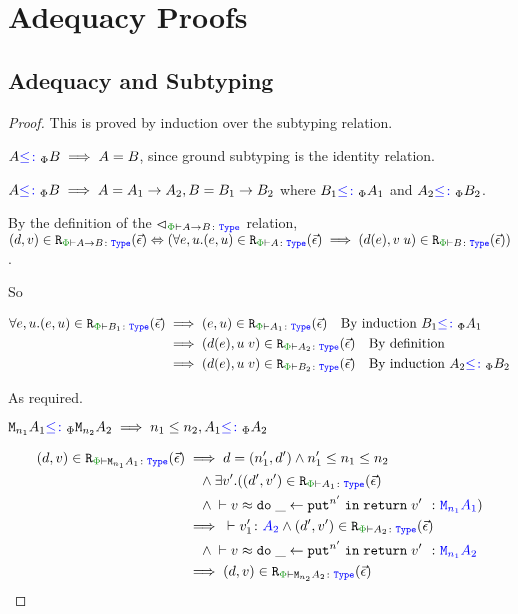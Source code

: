 \chapter{Adequacy Proofs}

\section{Adequacy and Subtyping}
\label{AdequacySubtypingProof}

\begin{framed}
    \begin{proof}
        This is proved by induction over the subtyping relation.
    
        \case{\sground}
        $A{\color{blue} \leq\colon}_\Phi B\implies A = B$, since ground subtyping is the identity relation.
    
    \case{\sfun}
        $A{\color{blue} \leq\colon}_\Phi B\implies A = A_1\rightarrow A_2, B = B_1\rightarrow B_2$ where $B_1{\color{blue} \leq\colon}_\Phi A_1$ and $A_2{\color{blue} \leq\colon}_\Phi B_2$.
    
        By the definition of the $\relates_{\wellformedt{\P}{\ab}}$ relation, $\inLogRelPE{d}{v}{\ab} \Leftrightarrow (\forall e, u. \inLogRelPE{e}{u}{A}\implies \inLogRelPE{d(e)}{\apply{v}{u}}{B})$.
    
        So 
    
        \begin{align*}
            \forall e, u. \inLogRelPE{e}{u}{B_1} & \implies \inLogRelPE{e}{u}{A_1} \qt{By induction $B_1\subtypep A_1$}\\
            & \implies \inLogRelPE{d(e)}{\apply{u}{v}}{A_2}\qt{By definition}\\
            & \implies \inLogRelPE{d(e)}{\apply{u}{v}}{B_2}\qt{By induction $A_2\subtypep B_2$}
        \end{align*}
    
        As required.
    \case{\seffect}
    
    $\texttt{M}_{n_1}{A_1} {\color{blue} \leq\colon}_\Phi \texttt{M}_{n_2}{A_2} \implies n_1\leq n_2, A_1{\color{blue} \leq\colon}_\Phi A_2$
    
    \begin{align*}
        \inLogRelPE{d}{v}{\M{n_1}{A_1}} & \implies  d=(n_1', d') \wedge n_1' \leq n_1\leq n_2 
        \\ & \quad\wedge \exists v'. (\inLogRelPE{d'}{v'}{A_1} 
        \\ & \quad\wedge\zberelation{v}{\doin{\_}{\put^{n'}}{\return{v'}}}{\M{n_1}{A_1}})
        \\
        & \implies \ztyperelation{v_1'}{A_2} \wedge \inLogRelPE{d'}{v'}{A_2} 
        \\ & \quad 
        \wedge \zberelation{v}{\doin{\_}{\put^{n'}}{\return{v'}}}{\M{n_1}{A_2}}
        \\
        & \implies \inLogRelPE{d}{v}{\M{n_2}{A_2}}
    \end{align*}
    

\end{proof}
\end{framed}
